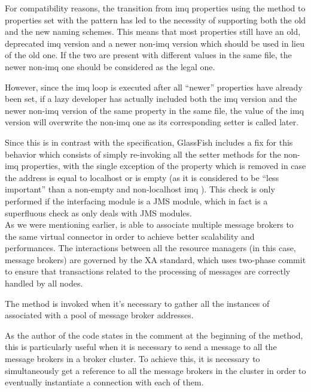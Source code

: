 For compatibility reasons, the transition from imq properties using the  method to properties set with the  pattern has led to the necessity of supporting both the old and the new naming schemes. This means that most properties still have an old, deprecated imq version and a newer non-imq version which should be used in lieu of the old one. If the two are present with different values in the same file, the newer non-imq one should be considered as the legal one.

However, since the imq loop is executed after all “newer” properties have already been set, if a lazy developer has actually included both the imq version and the newer non-imq version of the same property in the same file, the value of the imq version will overwrite the non-imq one as its corresponding setter is called later.

Since this is in contrast with the specification, GlassFish includes a fix for this behavior which consists of simply re-invoking all the setter methods for the non-imq properties, with the single exception of the  property which is removed in case the address is equal to localhost or is empty (as it is considered to be “less important” than a non-empty and non-localhost imq ). This check is only performed if the interfacing module is a JMS module, which in fact is a superfluous check as  only deals with JMS modules. \\

As we were mentioning earlier,  is able to associate multiple message brokers to the same virtual connector in order to achieve better scalability and performances. The interactions between all the resource managers (in this case, message brokers) are governed by the XA standard, which uses two-phase commit to ensure that transactions related to the processing of messages are correctly handled by all nodes.

The  method is invoked when it's necessary to gather all the instances of  associated with a pool of message broker addresses.

As the author of the code states in the comment at the beginning of the method, this is particularly useful when it is necessary to send a message to all the message brokers in a broker cluster. To achieve this, it is necessary to simultaneously get a reference to all the message brokers in the cluster in order to eventually instantiate a connection with each of them.

